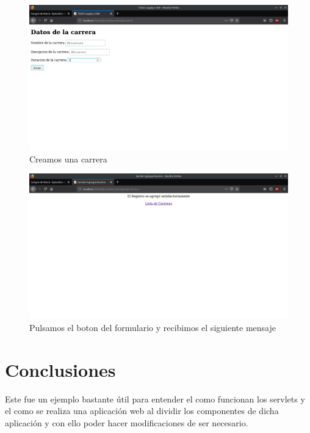 \documentclass[a4paper,12pt]{article}
\begin{document}
\begin{figure}[H]
\begin{center}
 \includegraphics[width=\textwidth]{img/alta1.png}
 \caption{Creamos una carrera}
 \label{fig:alta1}
\end{center}
\end{figure}

\begin{figure}[H]
\begin{center}
 \includegraphics[width=\textwidth]{img/alta2.png}
 \caption{Pulsamos el boton del formulario y recibimos el siguiente mensaje}
 \label{fig:alta2}
\end{center}
\end{figure}

\section{Conclusiones}
Este fue un ejemplo bastante útil para entender el como funcionan los servlets 
y el como se realiza una aplicación web al dividir los componentes de dicha 
aplicación y con ello poder hacer modificaciones de ser necesario.
\end{document}
